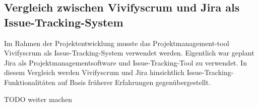 				\subsection{Vergleich zwischen Vivifyscrum und Jira als Issue-Tracking-System}
				
				Im Rahmen der Projektentwicklung musste das Projektmanagement-tool Vivifyscrum als Issue-Tracking-System verwendet werden. Eigentlich war geplant Jira als Projektmanagementsoftware und Issue-Tracking-Tool zu verwendet. In diesem Vergleich werden Vivifyscrum und Jira hinsichtlich Issue-Tracking-Funktionalitäten auf Basis früherer Erfahrungen gegenübergestellt. 
				
				TODO weiter machen
				
				